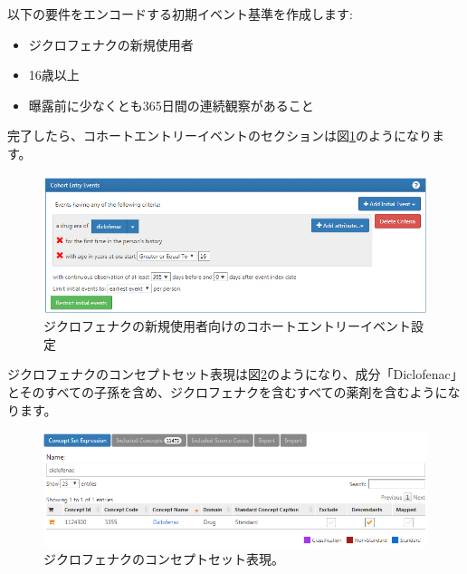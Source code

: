 \documentclass[
  11pt]{book}
\providecommand{\tightlist}{%
  \setlength{\itemsep}{0pt}\setlength{\parskip}{0pt}}
\theoremstyle{definition}
\theoremstyle{definition}
\theoremstyle{definition}
\theoremstyle{definition}
\theoremstyle{remark}
\begin{document}
以下の要件をエンコードする初期イベント基準を作成します:

\begin{itemize}
\tightlist
\item
  ジクロフェナクの新規使用者
\item
  16歳以上
\item
  曝露前に少なくとも365日間の連続観察があること
\end{itemize}

完了したら、コホートエントリーイベントのセクションは図\ref{fig:cohortsAtlasInitialEvents}のようになります。

\begin{figure}

{\centering \includegraphics[width=1\linewidth]{images/SuggestedAnswers/cohortsAtlasInitialEvents} 

}

\caption{ジクロフェナクの新規使用者向けのコホートエントリーイベント設定}\label{fig:cohortsAtlasInitialEvents}
\end{figure}

ジクロフェナクのコンセプトセット表現は図\ref{fig:cohortsAtlasConceptSet1}のようになり、成分「Diclofenac」とそのすべての子孫を含め、ジクロフェナクを含むすべての薬剤を含むようになります。

\begin{figure}

{\centering \includegraphics[width=1\linewidth]{images/SuggestedAnswers/cohortsAtlasConceptSet1} 

}

\caption{ジクロフェナクのコンセプトセット表現。}\label{fig:cohortsAtlasConceptSet1}
\end{figure}
\end{document}

